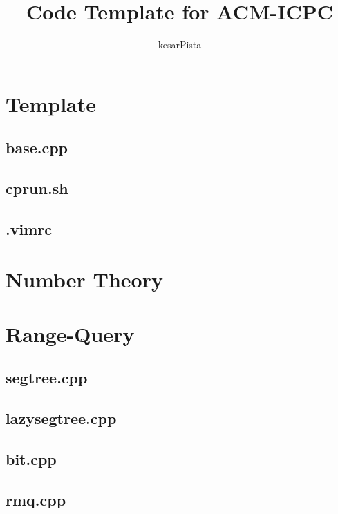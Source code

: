 \documentclass[a4paper, twocolumn]{article}
\title{Code Template for ACM-ICPC}
\author{kesarPista}
\begin{document}
\begin{titlepage}
\maketitle
\thispagestyle{empty}
\pagebreak
\pagestyle{fancy}
\lhead{}
\rhead{}
\cfoot{}
\tableofcontents
\end{titlepage}

\pagestyle{fancy}
\cfoot{- \thepage \ -}
  
\section{Template}
\subsection{base.cpp}

\subsection{cprun.sh}

\subsection{.vimrc}


\section{Number Theory}


\section{Range-Query}
\subsection{segtree.cpp}

\subsection{lazysegtree.cpp}

\subsection{bit.cpp}

\subsection{rmq.cpp}

\end{document}
